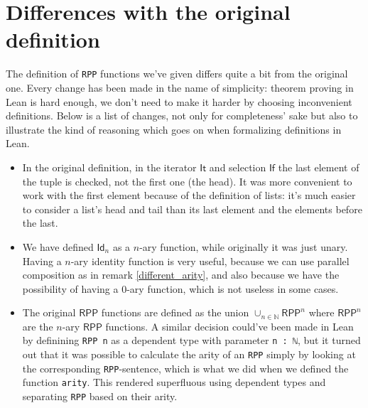 \documentclass[oneside]{book}
\theoremstyle{definition}
\theoremstyle{remark}
\theoremstyle{plain}
\newcommand{\NN}{\mathbb{N}}
\newcommand{\RPP}{\mathsf{RPP}}
\newcommand{\rppId}{\mathsf{Id}}
\newcommand{\rppIt}{\mathsf{It}}
\newcommand{\rppIf}{\mathsf{If}}
\begin{document}
\section{Differences with the original definition}
The definition of \lstinline{RPP} functions we've given differs quite a bit from the original one.
Every change has been made in the name of simplicity:
theorem proving in Lean is hard enough,
we don't need to make it harder by choosing inconvenient definitions.
Below is a list of changes, not only for completeness' sake but also to illustrate the kind of reasoning which goes on
when formalizing definitions in Lean.
\begin{itemize}
\item In the original definition,
in the iterator $\rppIt$ and selection $\rppIf$ the last element of the tuple is checked,
not the first one (the head).
It was more convenient to work with the first element because of the definition of lists:
it's much easier to consider a list's head and tail than its last element and the elements before the last.
\item We have defined $\rppId_n$ as a $n$-ary function, while originally it was just unary.
Having a $n$-ary identity function is very useful,
because we can use parallel composition as in remark \ref{different_arity},
and also because we have the possibility of having a $0$-ary function, which is not useless in some cases.
\item The original $\RPP$ functions are defined as the union $\cup_{n \in \NN}\RPP^n$
where $\RPP^n$ are the $n$-ary $\RPP$ functions.
A similar decision could've been made in Lean by definining \lstinline{RPP n} as a dependent type
with parameter \lstinline{n : ℕ},
but it turned out that it was possible to calculate the arity of an \lstinline{RPP} simply by looking at
the corresponding \lstinline{RPP}-sentence, which is what we did when we defined the function \lstinline{arity}.
This rendered superfluous using dependent types and separating \lstinline{RPP} based on their arity.


\end{itemize}
\end{document}

